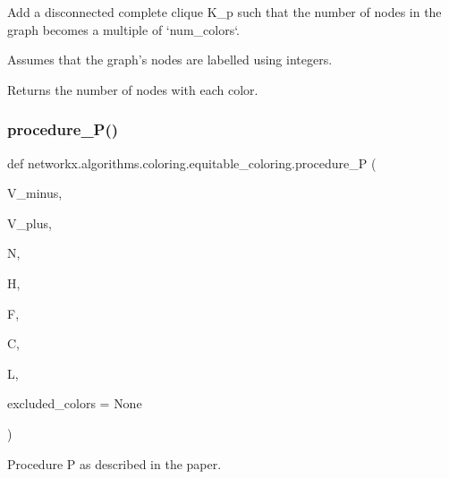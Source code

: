 \begin{DoxyVerb}Add a disconnected complete clique K_p such that the number of nodes in
the graph becomes a multiple of `num_colors`.

Assumes that the graph's nodes are labelled using integers.

Returns the number of nodes with each color.
\end{DoxyVerb}
 \mbox{\label{namespacenetworkx_1_1algorithms_1_1coloring_1_1equitable__coloring_ae77c7c09e94a019d26ad9302eb6a5004}} 
\subsubsection{\texorpdfstring{procedure\+\_\+\+P()}{procedure\_P()}}
{\footnotesize\ttfamily def networkx.\+algorithms.\+coloring.\+equitable\+\_\+coloring.\+procedure\+\_\+P (\begin{DoxyParamCaption}\item[{}]{V\+\_\+minus,  }\item[{}]{V\+\_\+plus,  }\item[{}]{N,  }\item[{}]{H,  }\item[{}]{F,  }\item[{}]{C,  }\item[{}]{L,  }\item[{}]{excluded\+\_\+colors = {\ttfamily None} }\end{DoxyParamCaption})}

\begin{DoxyVerb}Procedure P as described in the paper.\end{DoxyVerb}
 
